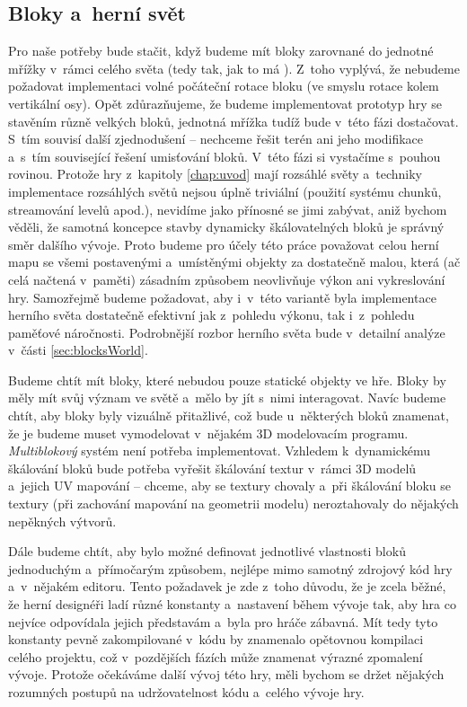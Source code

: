 
\subsection{Bloky a~herní svět}
\label{subsec:bloky}

Pro naše potřeby bude stačit, když budeme mít bloky zarovnané do jednotné mřížky v~rámci celého světa (tedy tak, jak to má \MC{}). Z~toho vyplývá, že nebudeme požadovat implementaci volné počáteční rotace bloku (ve smyslu rotace kolem vertikální osy). Opět zdůrazňujeme, že budeme implementovat prototyp hry se stavěním různě velkých bloků, jednotná mřížka tudíž bude v~této fázi dostačovat. S~tím souvisí další zjednodušení -- nechceme řešit terén ani jeho modifikace a~s~tím související řešení umisťování bloků. V~této fázi si vystačíme s~pouhou rovinou. Protože hry z~kapitoly \ref{chap:uvod} mají rozsáhlé světy a~techniky implementace rozsáhlých světů nejsou úplně triviální (použití systému chunků, streamování levelů apod.), nevidíme jako přínosné se jimi zabývat, aniž bychom věděli, že samotná koncepce stavby dynamicky škálovatelných bloků je správný směr dalšího vývoje. Proto budeme pro účely této práce považovat celou herní mapu se všemi postavenými a~umístěnými objekty za dostatečně malou, která (ač celá načtená v~paměti) zásadním způsobem neovlivňuje výkon ani vykreslování hry. Samozřejmě budeme požadovat, aby i~v~této variantě byla implementace herního světa dostatečně efektivní jak z~pohledu výkonu, tak i~z~pohledu paměťové náročnosti. Podrobnější rozbor herního světa bude v~detailní analýze v~části \ref{sec:blocksWorld}.

Budeme chtít mít bloky, které nebudou pouze statické objekty ve hře. Bloky by měly mít svůj význam ve světě a~mělo by jít s~nimi interagovat. Navíc budeme chtít, aby bloky byly vizuálně přitažlivé, což bude u~některých bloků znamenat, že je budeme muset vymodelovat v~nějakém 3D modelovacím programu. \textit{Multiblokový} systém není potřeba implementovat. Vzhledem k~dynamickému škálování bloků bude potřeba vyřešit škálování textur v~rámci 3D modelů a~jejich UV mapování -- chceme, aby se textury chovaly  a~při škálování bloku se textury (při zachování mapování na geometrii modelu) neroztahovaly do nějakých nepěkných výtvorů. 


Dále budeme chtít, aby bylo možné definovat jednotlivé vlastnosti bloků jednoduchým a~přímočarým způsobem, nejlépe mimo samotný zdrojový kód hry a~v~nějakém editoru. Tento požadavek je zde z~toho důvodu, že je zcela běžné, že herní designéři ladí různé konstanty a~nastavení během vývoje tak, aby hra co nejvíce odpovídala jejich představám a~byla pro hráče zábavná. Mít tedy tyto konstanty pevně zakompilované v~kódu by znamenalo opětovnou kompilaci celého projektu, což v~pozdějších fázích může znamenat výrazné zpomalení vývoje. Protože očekáváme další vývoj této hry, měli bychom se držet nějakých rozumných postupů na udržovatelnost kódu a~celého vývoje hry.

